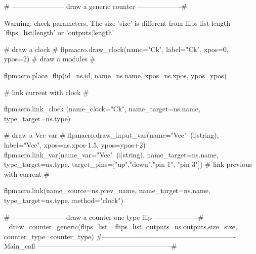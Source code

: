 {%
{%
{%
{# -----------------------
 draw a generic counter
-------------------#}
{%

{%
 Warning: check parameters, The size '{{size}}' is different from flips list length '{{flips_list|length}}' or
 '{{outputs|length}}'
{%
    {# draw a clock #}
    {{ flpmacro.draw_clock(name="Ck", label="Ck", xpos=0, ypos=2)}}
    {# draw a modules #}
    {%
    {%
    {%
        {%
        {%
        {%
        {%
        {{ flpmacro.place_flip(id=ns.id, name=ns.name, xpos=ns.xpos, ypos=ypos)}}

        {# link current with clock #}
        {%
        {{ flpmacro.link_clock (name_clock="Ck", name_target=ns.name, type_target=ns.type)}}
        {%

        {# draw a Vcc var #}
        {{ flpmacro.draw_input_var(name="Vcc"~(i|string), label="Vcc", xpos=ns.xpos-1.5, ypos=ypos+2)}}
        {{ flpmacro.link_var(name_var="Vcc"~(i|string), name_target=ns.name, type_target=ns.type, target_pins=["up","down","pin 1", "pin 3"])}}
        {# link previous with current #}
        {%
            {{ flpmacro.link(name_source=ns.prev_name, name_target=ns.name, type_target=ns.type, method="clock")}}
        {%
        {%
        {%
    {%

{%
{%

{# -----------------------
 draw a counter one type flip
-------------------#}
{%
{%
{%
{%
    {%
{%
{{ _draw_counter_generic(flips_list= flips_list, outputs=ns.outputs,size=size, counter_type=counter_type)}}
{%
{#----------------------------------------------------------
 Main_call
----------------------------------------------------------#}
}}}}}}}}}}}}}}}}}}}}}}}}}}}}}
